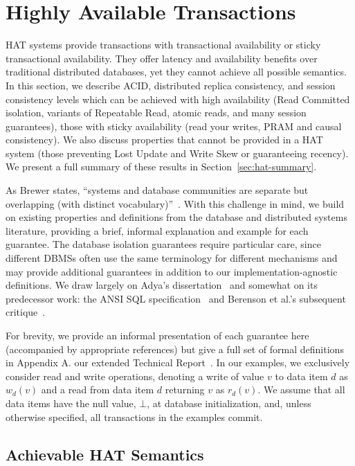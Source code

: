 
\section{Highly Available Transactions}
\label{sec:hats}

HAT systems provide transactions with transactional availability or
sticky transactional availability. They offer latency and availability
benefits over traditional distributed databases, yet they cannot
achieve all possible semantics. In this section, we describe ACID,
distributed replica consistency, and session consistency levels which
can be achieved with high availability (Read Committed isolation,
variants of Repeatable Read, atomic reads, and many session
guarantees), those with sticky availability (read your writes, PRAM
and causal consistency). We also discuss properties that cannot be
provided in a HAT system (those preventing Lost Update and Write Skew
or guaranteeing recency).  We present a full summary of these results
in Section~\ref{sec:hat-summary}.

As Brewer states, ``systems and database communities are separate but
overlapping (with distinct vocabulary)''~\cite{brewer-slides}. With
this challenge in mind, we build on existing properties and
definitions from the database and distributed systems literature,
providing a brief, informal explanation and example for each
guarantee. The database isolation guarantees require particular care,
since different DBMSs often use the same terminology for different
mechanisms and may provide additional guarantees in addition to our
implementation-agnostic definitions.  We draw largely on Adya's
dissertation~\cite{adya} and somewhat on its predecessor work: the
ANSI SQL specification~\cite{ansi-sql} and Berenson et al.'s
subsequent critique~\cite{ansicritique}.

For brevity, we provide an informal presentation of each guarantee
here (accompanied by appropriate references) but give a full set of
formal definitions in
\iftechreport
 Appendix A.
\else
 our extended Technical Report~\cite{hat-tr}.
\fi
In our examples, we exclusively consider read and write operations,
denoting a write of value $v$ to data item $d$ as $w_d(v)$ and a read
from data item $d$ returning $v$ as $r_d(v)$. We assume that all data
items have the null value, $\bot$, at database initialization, and,
unless otherwise specified, all transactions in the examples commit.

\subsection{Achievable HAT Semantics}

